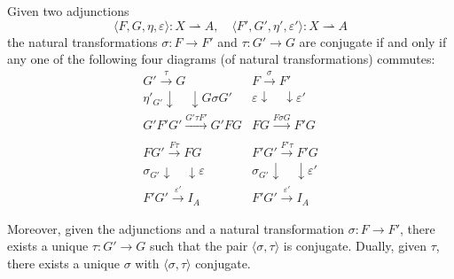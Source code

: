 Given two adjunctions
$$\langle F, G, \eta, \varepsilon \rangle : X \rightharpoonup A, \quad \langle F', G', \eta', \varepsilon' \rangle : X \rightharpoonup A$$
the natural transformations $\sigma : F \to F'$ and $\tau : G' \to G$ are conjugate if and only if any one of the following four diagrams (of natural transformations) commutes:
\[
\begin{array}{cc}
G' \xrightarrow{\tau} G & F \xrightarrow{\sigma} F' \\
\eta'_{G'} \downarrow \quad \downarrow G\sigma G' & \varepsilon \downarrow \quad \downarrow \varepsilon' \\
G'F'G' \xrightarrow{G'\tau F'} G'FG & FG \xrightarrow{F\sigma G} F'G \\
\\
FG' \xrightarrow{F\tau} FG & F'G' \xrightarrow{F'\tau} F'G \\
\sigma_{G'} \downarrow \quad \downarrow \varepsilon & \sigma_{G'} \downarrow \quad \downarrow \varepsilon' \\
F'G' \xrightarrow{\varepsilon'} I_A & F'G' \xrightarrow{\varepsilon'} I_A
\end{array}
\]

Moreover, given the adjunctions and a natural transformation $\sigma : F \to F'$, there exists a unique $\tau : G' \to G$ such that the pair $\langle \sigma, \tau \rangle$ is conjugate. Dually, given $\tau$, there exists a unique $\sigma$ with $\langle \sigma, \tau \rangle$ conjugate.
